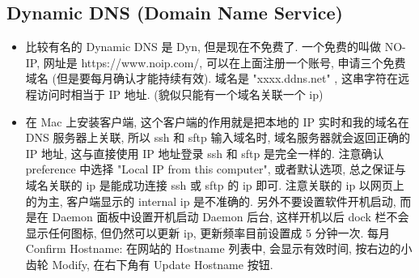 \subsection{Dynamic DNS (Domain Name Service)}
\begin{itemize}
\item 比较有名的 Dynamic DNS 是 Dyn, 但是现在不免费了. 一个免费的叫做 NO-IP, 网址是 https://www.noip.com/, 可以在上面注册一个账号, 申请三个免费域名 (但是要每月确认才能持续有效).  域名是 "xxxx.ddns.net"  , 这串字符在远程访问时相当于 IP 地址. (貌似只能有一个域名关联一个 ip)

\item 在 Mac 上安装客户端, 这个客户端的作用就是把本地的 IP 实时和我的域名在 DNS 服务器上关联, 所以 ssh 和 sftp 输入域名时, 域名服务器就会返回正确的 IP 地址, 这与直接使用 IP 地址登录 ssh 和 sftp 是完全一样的.
注意确认 preference 中选择 "Local IP from this computer", 或者默认选项, 总之保证与域名关联的 ip 是能成功连接 ssh 或 sftp 的 ip 即可. 注意关联的 ip 以网页上的为主, 客户端显示的 internal ip 是不准确的.
另外不要设置软件开机启动, 而是在 Daemon 面板中设置开机启动 Daemon 后台, 这样开机以后 dock 栏不会显示任何图标, 但仍然可以更新 ip, 更新频率目前设置成 5 分钟一次.
每月 Confirm Hostname: 在网站的 Hostname 列表中, 会显示有效时间, 按右边的小齿轮 Modify, 在右下角有 Update Hostname 按钮.
\end{itemize}
